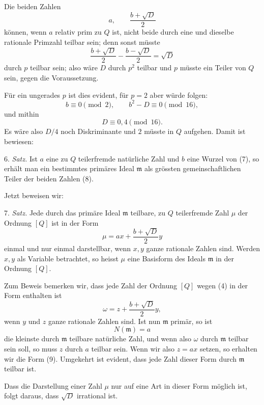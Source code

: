 \documentclass[11pt]{article}
\begin{document}
Die beiden Zahlen
\begin{equation}
 a,\qquad \frac{b+\sqrt D}{2}
\tag{8}
\end{equation}
können, wenn $a$ relativ prim zu $Q$ ist, nicht beide durch eine und dieselbe rationale Primzahl teilbar sein; denn sonst müsste
\[
 \frac{b+\sqrt D}{2}-\frac{b-\sqrt D}{2}=\sqrt D
\]
durch $p$ teilbar sein; also wäre $D$ durch $p^2$ teilbar und $p$ müsste ein Teiler von $Q$ sein, gegen die Voraussetzung.

Für ein ungerades $p$ ist dies evident, für $p=2$ aber würde folgen:
\[
 b\equiv0\pmod2,
 \qquad b^2-D\equiv0\pmod{16},
\]
und mithin
\[
 D\equiv0,4\pmod{16}.
\]
Es wäre also $D/4$ noch Diskriminante und $2$ müsste in $Q$ aufgehen. Damit ist bewiesen:

6. \emph{Satz.} Ist $a$ eine zu $Q$ teilerfremde natürliche Zahl und $b$ eine Wurzel von (7), so erhält man ein bestimmtes primäres Ideal $\mathfrak m$ als grössten gemeinschaftlichen Teiler der beiden Zahlen (8).

Jetzt beweisen wir:

7. \emph{Satz.} Jede durch das primäre Ideal $\mathfrak m$ teilbare, zu $Q$ teilerfremde Zahl $\mu$ der Ordnung $[Q]$ ist in der Form
\begin{equation}
 \mu=ax+\frac{b+\sqrt D}{2}y
\tag{9}
\end{equation}
einmal und nur einmal darstellbar, wenn $x,y$ ganze rationale Zahlen sind. Werden $x,y$ als Variable betrachtet, so heisst $\mu$ eine Basisform des Ideals $\mathfrak m$ in der Ordnung $[Q]$.

Zum Beweis bemerken wir, dass jede Zahl der Ordnung $[Q]$ wegen (4) in der Form enthalten ist
\begin{equation}
 \omega=z+\frac{b+\sqrt D}{2}y,
\tag{10}
\end{equation}
wenn $y$ und $z$ ganze rationale Zahlen sind. Ist nun $\mathfrak m$ primär, so ist
\begin{equation}
 N(\mathfrak m)=a
\tag{11}
\end{equation}
die kleinste durch $\mathfrak m$ teilbare natürliche Zahl, und wenn also $\omega$ durch $\mathfrak m$ teilbar sein soll, so muss $z$ durch $a$ teilbar sein. Wenn wir also $z=ax$ setzen, so erhalten wir die Form (9). Umgekehrt ist evident, dass jede Zahl dieser Form durch $\mathfrak m$ teilbar ist.

Dass die Darstellung einer Zahl $\mu$ nur auf eine Art in dieser Form möglich ist, folgt daraus, dass $\sqrt D$ irrational ist.
\end{document}
